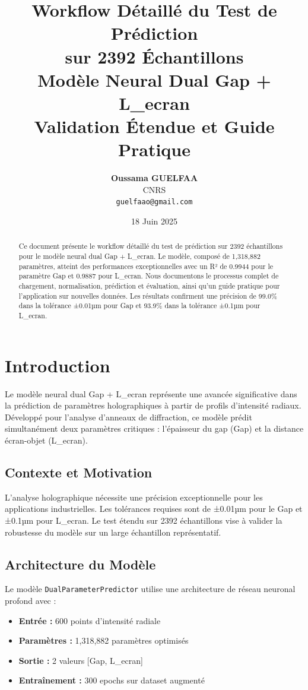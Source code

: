 \documentclass[10pt,twocolumn]{article}
\title{\color{darkblue}\textbf{Workflow Détaillé du Test de Prédiction\\sur 2392 Échantillons}\\
\large\color{lightblue}Modèle Neural Dual Gap + L\_ecran\\
Validation Étendue et Guide Pratique}
\author{
\textbf{Oussama GUELFAA}\\
\small CNRS \\
\small \texttt{guelfaao@gmail.com}
}
\date{\color{darkblue}18 Juin 2025}
\begin{document}
\maketitle

\begin{abstract}
\color{darkblue}
Ce document présente le workflow détaillé du test de prédiction sur 2392 échantillons pour le modèle neural dual Gap + L\_ecran. Le modèle, composé de 1,318,882 paramètres, atteint des performances exceptionnelles avec un R² de 0.9944 pour le paramètre Gap et 0.9887 pour L\_ecran. Nous documentons le processus complet de chargement, normalisation, prédiction et évaluation, ainsi qu'un guide pratique pour l'application sur nouvelles données. Les résultats confirment une précision de 99.0\% dans la tolérance ±0.01µm pour Gap et 93.9\% dans la tolérance ±0.1µm pour L\_ecran.
\end{abstract}

\section{Introduction}

Le modèle neural dual Gap + L\_ecran représente une avancée significative dans la prédiction de paramètres holographiques à partir de profils d'intensité radiaux. Développé pour l'analyse d'anneaux de diffraction, ce modèle prédit simultanément deux paramètres critiques : l'épaisseur du gap (Gap) et la distance écran-objet (L\_ecran).

\subsection{Contexte et Motivation}

L'analyse holographique nécessite une précision exceptionnelle pour les applications industrielles. Les tolérances requises sont de ±0.01µm pour le Gap et ±0.1µm pour L\_ecran. Le test étendu sur 2392 échantillons vise à valider la robustesse du modèle sur un large échantillon représentatif.

\subsection{Architecture du Modèle}

Le modèle \texttt{DualParameterPredictor} utilise une architecture de réseau neuronal profond avec :
\begin{itemize}
    \item \textbf{Entrée :} 600 points d'intensité radiale
    \item \textbf{Paramètres :} 1,318,882 paramètres optimisés
    \item \textbf{Sortie :} 2 valeurs [Gap, L\_ecran]
    \item \textbf{Entraînement :} 300 epochs sur dataset augmenté
\end{itemize}
\end{document}
